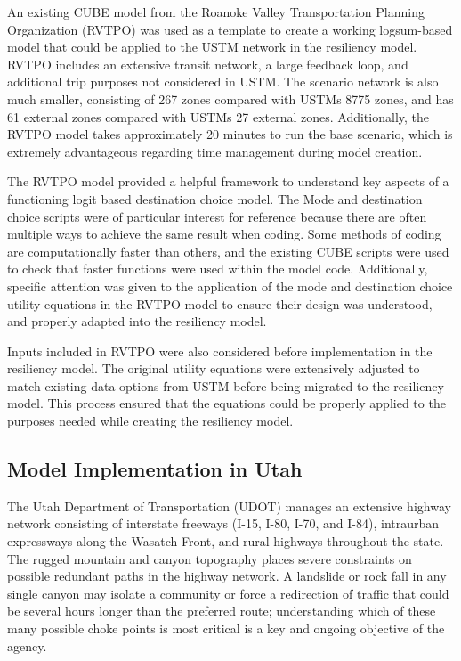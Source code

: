 An existing CUBE model from the Roanoke Valley Transportation Planning Organization (RVTPO) was used as a template to create a working logsum-based model that could be applied to the USTM
network in the resiliency model. RVTPO includes an extensive transit network, a large feedback
loop, and additional trip purposes not considered in USTM. The scenario network is also much
smaller, consisting of 267 zones compared with USTMs 8775 zones, and has 61 external zones
compared with USTMs 27 external zones. Additionally, the RVTPO model takes approximately 20
minutes to run the base scenario, which is extremely advantageous regarding time management during model creation.

The RVTPO model provided a helpful framework to understand key aspects of a functioning logit
based destination choice model. The Mode and destination choice scripts were of particular
interest for reference because there are often multiple ways to achieve the same result when coding. Some methods of coding are computationally faster than others, and the existing CUBE scripts were used to
check that faster functions were used within the model code. Additionally, specific attention was
given to the application of the mode and destination choice utility equations in the RVTPO model
to ensure their design was understood, and properly adapted into the resiliency model.

Inputs included in RVTPO were also considered before
implementation in the resiliency model. The original utility equations were extensively adjusted to match existing data options from USTM before being
migrated to the resiliency model. This process ensured that the equations could be properly applied to the purposes needed while creating the resiliency model.

\subsection{Model Implementation in Utah}

The Utah Department of Transportation (UDOT) manages an extensive highway
network consisting of interstate freeways (I-15, I-80, I-70, and I-84),
intraurban expressways along the Wasatch Front, and rural highways throughout
the state. The rugged mountain and canyon topography places
severe constraints on possible redundant paths in the highway network. A
landslide or rock fall in any single canyon may isolate a community or force a
redirection of traffic that could be several hours longer than the preferred
route; understanding which of these many possible choke points is most
critical is a key
and ongoing objective of the agency.

